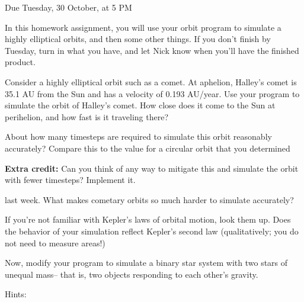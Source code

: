 \documentclass[12pt]{article}
\begin{document}
\Large
\centerline{}
\centerline{Due Tuesday, 30 October, at 5 PM}
\normalsize

In this homework assignment, you will use your orbit program to simulate
a highly elliptical orbits, and then some other things. If you don't finish by Tuesday, turn in what you have, and let Nick know when you'll have the finished product. 

\begin{enumerate}

  \item{Consider a highly elliptical orbit such as a comet. At aphelion, Halley's comet is 35.1 AU from the Sun and has a velocity of 0.193 AU/year.
    Use your program to simulate the orbit of Halley's comet. How close does it come to the Sun at perihelion, and how fast is it traveling there? 
    
    About how many timesteps are required to simulate this orbit reasonably accurately? Compare this to the value for a circular orbit that you determined

\item{{\bf Extra credit:} Can you think of any way to mitigate this and simulate the orbit with fewer timesteps? Implement it.}

  last week. What makes cometary orbits so much harder to simulate accurately?}

\item If you're not familiar with Kepler's laws of orbital motion, look them up. Does the
behavior of your simulation reflect Kepler's second law (qualitatively; you do not need
to measure areas!)
  
\item{Now, modify your program to simulate a binary star system with two stars
of unequal mass-- that is, two objects
responding to each other's gravity. 

    Hints:

}
\end{enumerate}
\end{document}
